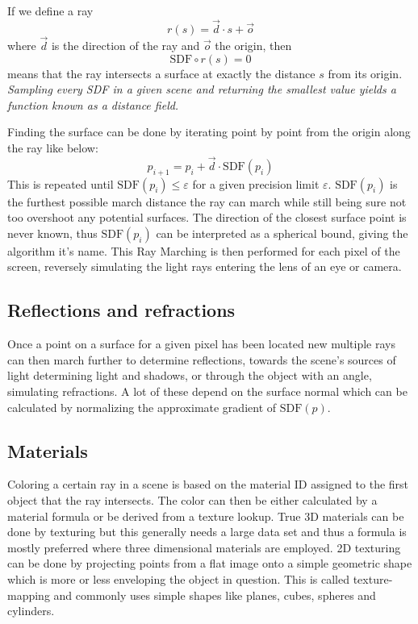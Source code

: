 		If we define a ray $$r(s) = \vec{d} \cdot s + \vec{o}$$
		where $\vec{d}$ is the direction of the ray and $\vec{o}$ the origin, then
		$$\text{SDF}\circ r(s) = 0$$ means that the ray intersects a surface at
		exactly the distance $s$ from its origin.  \emph{ Sampling every SDF in a
		given scene and returning the smallest value yields a function known as a
		distance field.  }

		\bigskip
		\noindent Finding the surface can be done by iterating point by point from the
		origin along the ray like below: $$p_{i+1} = p_i + \vec{d}\cdot
		\text{SDF}(p_i)$$ This is repeated until $\text{SDF}(p_i) \leq
		\varepsilon$ for a given precision limit $\varepsilon$.
		$\text{SDF}(p_i)$ is the furthest possible march distance the ray can 
		march while still being sure not too overshoot any potential surfaces.  
		The direction of the closest surface point is never known, thus 
		$\text{SDF}(p_i)$ can be interpreted as a spherical bound, giving the 
		algorithm it's name. This Ray Marching is then performed for each pixel 
		of the screen, reversely simulating the light rays entering the lens of 
		an eye or camera.
			
			\subsection{Reflections and refractions}
		
				Once a point on a surface for a given pixel has been located
				new multiple rays can then march further to determine
				reflections, towards the scene's sources of light determining
				light and shadows, or through the object with an angle,
				simulating refractions. A lot of these depend on the surface
				normal which can be calculated by normalizing the approximate
				gradient of $\text{SDF}(p)$. 
		
			\subsection{Materials}
				Coloring a certain ray in a scene is based on the material ID
				assigned to the first object that the ray intersects. The color
				can then be either calculated by a material formula or be 
				derived from a texture lookup. True 3D materials can be done by
				texturing but this generally needs a large data set and thus a 
				formula is mostly preferred where three dimensional materials 
				are employed. 2D texturing can be done by projecting points from
				a flat image onto a simple geometric shape  which is more or less 
				enveloping the object in question. This is called texture-mapping 
				and commonly uses simple shapes like planes, cubes, spheres and 
				cylinders. 
				
